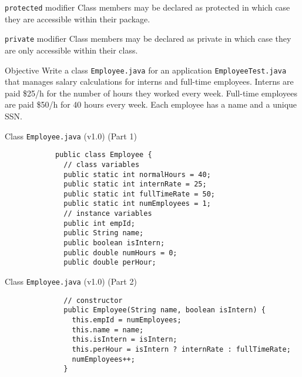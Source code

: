 \documentclass[10pt, compress]{beamer}
\begin{document}
\begin{slide}
	\begin{block}{\texttt{protected} modifier}
		Class members may be declared as \alert{protected} in which case they are accessible within their package.
	\end{block}
	\begin{block}{\texttt{private} modifier}
		Class members may be declared as \alert{private} in which case they are only accessible within their class.
	\end{block}
\end{slide}

\begin{slide}
	\begin{block}{Objective}
		Write a class \texttt{Employee.java} for an application \texttt{EmployeeTest.java} that manages salary calculations for interns and full-time employees.
		Interns are paid \$25/h for the number of hours they worked every week.
		Full-time employees are paid \$50/h for 40 hours every week.
		Each employee has a name and a unique SSN.
	\end{block}
\end{slide}

\begin{slide}
	\begin{block}{Class \texttt{Employee.java} (v1.0) (Part 1)}
		\begin{verbatim}
			public class Employee {
			  // class variables
			  public static int normalHours = 40;
			  public static int internRate = 25;
			  public static int fullTimeRate = 50;
			  public static int numEmployees = 1;
			  // instance variables
			  public int empId;
			  public String name;
			  public boolean isIntern;
			  public double numHours = 0;
			  public double perHour;
		\end{verbatim}
	\end{block}
\end{slide}

\begin{slide}
	\begin{block}{Class \texttt{Employee.java} (v1.0) (Part 2)}
		\begin{verbatim}
			  // constructor
			  public Employee(String name, boolean isIntern) {
			    this.empId = numEmployees;
			    this.name = name;
			    this.isIntern = isIntern;
			    this.perHour = isIntern ? internRate : fullTimeRate;
			    numEmployees++;
			  }
		\end{verbatim}
	\end{block}
\end{slide}
\end{document}
